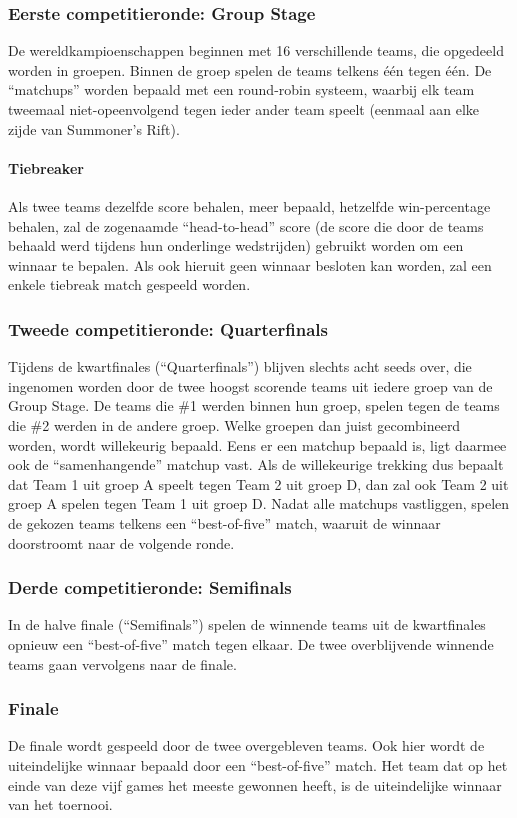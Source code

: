 \documentclass[12pt,a4paper]{article}
\begin{document}
			\subsubsection{Eerste competitieronde: Group Stage}
				De wereldkampioenschappen beginnen met 16 verschillende teams, die opgedeeld worden in groepen. Binnen de groep spelen de teams telkens één tegen één. De ``matchups'' worden bepaald met een round-robin systeem, waarbij elk team tweemaal niet-opeenvolgend tegen ieder ander team speelt (eenmaal aan elke zijde van Summoner's Rift).
				\paragraph{Tiebreaker}
				Als twee teams dezelfde score behalen, meer bepaald, hetzelfde win-percentage behalen, zal de zogenaamde ``head-to-head'' score (de score die door de teams behaald werd tijdens hun onderlinge wedstrijden) gebruikt worden om een winnaar te bepalen. Als ook hieruit geen winnaar besloten kan worden, zal een enkele tiebreak match gespeeld worden.
			\subsubsection{Tweede competitieronde: Quarterfinals}
				Tijdens de kwartfinales (``Quarterfinals'') blijven slechts acht seeds over, die ingenomen worden door de twee hoogst scorende teams uit iedere groep van de Group Stage. De teams die \#1 werden binnen hun groep, spelen tegen de teams die \#2 werden in de andere groep. Welke groepen dan juist gecombineerd worden, wordt willekeurig bepaald. Eens er een matchup bepaald is, ligt daarmee ook de ``samenhangende'' matchup vast. Als de willekeurige trekking dus bepaalt dat Team 1 uit groep A speelt tegen Team 2 uit groep D, dan zal ook Team 2 uit groep A spelen tegen Team 1 uit groep D. Nadat alle matchups vastliggen, spelen de gekozen teams telkens een ``best-of-five'' match, waaruit de winnaar doorstroomt naar de volgende ronde.
			\subsubsection{Derde competitieronde: Semifinals}
				In de halve finale (``Semifinals'') spelen de winnende teams uit de kwartfinales opnieuw een ``best-of-five'' match tegen elkaar. De twee overblijvende winnende teams gaan vervolgens naar de finale.
			\subsubsection{Finale}
				De finale wordt gespeeld door de twee overgebleven teams. Ook hier wordt de uiteindelijke winnaar bepaald door een ``best-of-five'' match. Het team dat op het einde van deze vijf games het meeste gewonnen heeft, is de uiteindelijke winnaar van het toernooi.
\end{document}
